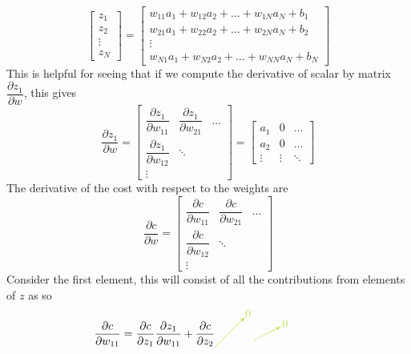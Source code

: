 \documentclass[11pt]{report} %
\begin{document}
\begin{equation}
\begin{bmatrix}z_{1}\\
z_{2}\\
\vdots\\
z_{N}
\end{bmatrix}=\begin{bmatrix}w_{11}a_{1}+w_{12}a_{2}+\dots+w_{1N}a_{N}+b_{1}\\
w_{21}a_{1}+w_{22}a_{2}+\dots+w_{2N}a_{N}+b_{2}\\
\vdots\\
w_{N1}a_{1}+w_{N2}a_{2}+\dots+w_{NN}a_{N}+b_{N}
\end{bmatrix}
\end{equation}
This is helpful for seeing that if we compute the derivative of scalar by matrix $\dfrac{\partial z_{1}}{\partial w}$, this gives
\begin{equation}
\dfrac{\partial z_{1}}{\partial w}=\begin{bmatrix}\dfrac{\partial z_{1}}{\partial w_{11}} & \dfrac{\partial z_{1}}{\partial w_{21}} & \dots\\
\dfrac{\partial z_{1}}{\partial w_{12}} & \ddots\\
\vdots
\end{bmatrix}=\begin{bmatrix}a_{1} & 0 & \dots\\
a_{2} & 0 & \dots\\
\vdots & \vdots & \ddots
\end{bmatrix}
\end{equation}
The derivative of the cost with respect to the weights are
\begin{equation}
\dfrac{\partial c}{\partial w}=\begin{bmatrix}\dfrac{\partial c}{\partial w_{11}} & \dfrac{\partial c}{\partial w_{21}} & \dots\\
\dfrac{\partial c}{\partial w_{12}} & \ddots\\
\vdots
\end{bmatrix}
\end{equation}
Consider the first element, this will consist of all the contributions from elements of $z$ as so
\begin{equation}
\dfrac{\partial c}{\partial w_{11}}=\dfrac{\partial c}{\partial z_{1}}\dfrac{\partial z_{1}}{\partial w_{11}}+\dfrac{\partial c}{\partial z_{2}}\green\cancelto{0}{\black\dfrac{\partial z_{2}}{\partial w_{11}}}\black+\green\cancelto{0}{\black\left[\dots\right]}\black=\dfrac{\partial c}{\partial z_{1}}a_{1}
\end{equation}
\end{document}
